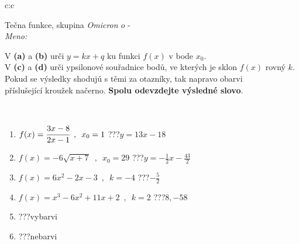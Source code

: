 \documentclass[10pt]{report}
\newcommand\omicron{o}
\begin{document}
\newpage
\thispagestyle{empty}
\begin{tabular}{c:c}
\begin{minipage}[c][104.5mm][t]{0.5\linewidth}
\begin{center}
\vspace{7mm}
{\huge Tečna funkce, skupina \textit{Omicron $\omicron$} -}\\[5mm]
\textit{Meno:}\phantom{xxxxxxxxxxxxxxxxxxxxxxxxxxxxxxxxxxxxxxxxxxxxxxxxxxxxxxxxxxxxxxxxx}\\[5mm]
\begin{minipage}{0.95\linewidth}
\begin{center}
V \textbf{(a)} a \textbf{(b)} urči  $y = kx + q$ ku funkci $f(x)$ v bode $x_0$.\\V \textbf{(c)} a \textbf{(d)} urči ypsilonové souřadnice bodů, ve kterých je sklon $f(x)$ rovný $k$.\\Pokud se výsledky shodujú s těmi za otazníky, tak napravo obarvi\\příslušející kroužek načerno. \textbf{Spolu odevzdejte výsledné slovo}.
\end{center}
\end{minipage}
\\[1mm]
\begin{minipage}{0.79\linewidth}
\begin{center}
\begin{varwidth}{\linewidth}
\begin{enumerate}
\small
\item $f(x)=\cfrac{3x-8}{2x-1}\enspace , \enspace x_0=1$\quad \dotfill\; ???\;\dotfill \quad $y = 13x-18$
\item $f(x)=-6\sqrt{x+7}\enspace , \enspace x_0=29$\quad \dotfill\; ???\;\dotfill \quad $y = -\frac{1}{2}x-\frac{43}{2}$
\item $f(x)=6x^2-2x-3\enspace , \enspace k=-4$\quad \dotfill\; ???\;\dotfill \quad $-\frac{5}{2}$
\item $f(x)=x^3-6x^2+11x+2\enspace , \enspace k=2$\quad \dotfill\; ???\;\dotfill \quad $8 , -58$
\item \quad \dotfill\; ???\;\dotfill \quad vybarvi
\item \quad \dotfill\; ???\;\dotfill \quad nebarvi
\end{enumerate}
\end{varwidth}
\end{center}
\end{minipage}
\begin{minipage}{0.20\linewidth}

\end{minipage}
\end{center}
\end{minipage}
\end{tabular}
\end{document}
